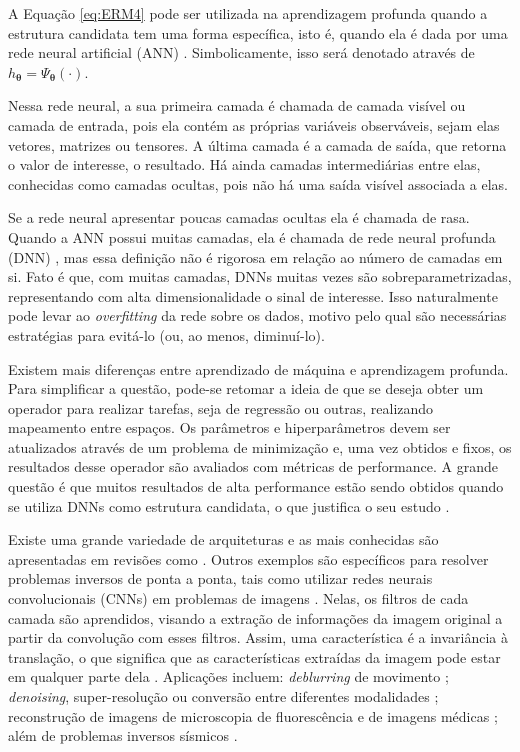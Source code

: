 A Equação \eqref{eq:ERM4} pode ser utilizada na aprendizagem profunda quando a estrutura candidata tem uma forma específica, isto é, quando ela é dada por uma rede neural artificial (ANN) \cite[pág. 1]{Prince2023}. Simbolicamente, isso será denotado através de $h_{\bm{\theta}} = \Psi_{\bm{\theta}}( \cdot)$. 


Nessa rede neural, a sua primeira camada é chamada de camada visível ou camada de entrada, pois ela contém as próprias variáveis observáveis, sejam elas vetores, matrizes ou tensores. A última camada é a camada de saída, que retorna o valor de interesse, o resultado. Há ainda camadas intermediárias entre elas, conhecidas como camadas ocultas, pois não há uma saída visível associada a elas.

Se a rede neural apresentar poucas camadas ocultas ela é chamada de rasa. Quando a ANN possui muitas camadas, ela é chamada de rede neural profunda (DNN) \cite{goodfellow2016deep}, mas essa definição não é rigorosa em relação ao número de camadas em si. Fato é que, com muitas camadas, DNNs muitas vezes são sobreparametrizadas, representando com alta dimensionalidade o sinal de interesse. Isso naturalmente pode levar ao \textit{overfitting} da rede sobre os dados, motivo pelo qual são necessárias estratégias para evitá-lo (ou, ao menos, diminuí-lo). 

Existem mais diferenças entre aprendizado de máquina e aprendizagem profunda. Para simplificar a questão, pode-se retomar a ideia de que se deseja obter um operador para realizar tarefas, seja de regressão ou outras, realizando mapeamento entre espaços. Os parâmetros e hiperparâmetros devem ser atualizados através de um problema de minimização e, uma vez obtidos e fixos, os resultados desse operador são avaliados com métricas de performance. A grande questão é que muitos resultados de alta performance estão sendo obtidos quando se utiliza DNNs como estrutura candidata, o que justifica o seu estudo \cite{goodfellow2016deep}. 

Existe uma grande variedade de arquiteturas e as mais conhecidas são apresentadas em revisões como \cite{Khamparia2019, Shrestha2019}. Outros exemplos são específicos para resolver problemas inversos de ponta a ponta, tais como utilizar redes neurais convolucionais (CNNs) em problemas de imagens \cite[Capítulo 9]{goodfellow2016deep}. Nelas, os filtros de cada camada são aprendidos, visando a extração de informações da imagem original a partir da convolução com esses filtros. Assim, uma característica é a invariância à translação, o que significa que as características extraídas da imagem pode estar em qualquer parte dela \cite[pág. 342]{goodfellow2016deep}. Aplicações incluem: \textit{deblurring} de movimento \cite{Koh2021}; \textit{denoising}, super-resolução ou conversão entre diferentes modalidades \cite{Kaji2019}; reconstrução de imagens de microscopia de fluorescência \cite{Belthangady2019} e de imagens médicas \cite{Ongie2020}; além de problemas inversos sísmicos \cite{Adler2021}. 


